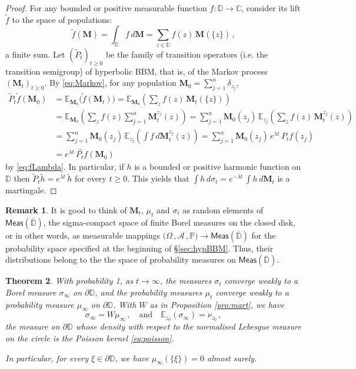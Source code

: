 \documentclass[12pt]{amsart}
\newcommand\A{\mathcal A}
\newcommand\AND{\quad\text{and}\quad}
\newcommand\C{\mathbb C}
\newcommand\E{\mathbb E}
\newcommand\DD{\mathbb D}
\newcommand\Laa{\sigma}
\newcommand\Mbf{\mathbf M}
\newcommand\Prob{\mathbb P}
\newcommand\wt{\widetilde}
\newcommand\ww{W}
\newtheorem{theorem}{Theorem}%
\numberwithin{theorem}{section}
\theoremstyle{definition}
\newtheorem{rem}[theorem]{Remark}%
\begin{document}
\begin{proof}
For any bounded or positive measurable function $f : \DD \to \C$, consider its lift 
$\wt f$ to the space of populations:
$$
\wt f(\Mbf) = \int_{\DD} f\, d\Mbf = \sum_{z \in \DD} f(z)\, \Mbf(\{z\})\,,
$$
a finite sum. Let $(\wt P_t)_{t\ge 0}$ be the family of transition operators (i.e. the 
transition semigroup) of hyperbolic BBM, that is, of the Markov process $(\Mbf_t)_{t\ge 0}$.
By \eqref{eq:Markov}, for any population $\Mbf_0 = \sum_{j=1}^n \delta_{z_j}$,
$$
\begin{aligned}
 \wt P_t \wt f(\Mbf_0) &= \E_{\Mbf_0}\bigl( \wt f (\Mbf_t) \bigr)
 = \E_{\Mbf_0}  \left( \sum_z f(z)\, \Mbf_t(\{z\}) \right)\\
 &= \E_{\Mbf_0}  \left( \sum_z f(z) \sum_{j=1}^n \Mbf^{z_j}_t(z) \right)
 = \sum_{j=1}^n \Mbf_0(z_j)\, \E_{z_j}\left( \sum_z f(z) \, \Mbf^{z_j}_t(z) \right)\\
 &= \sum_{j=1}^n \Mbf_0(z_j)\,\E_{z_j}\left( \int f \, d\Mbf^{z_j}_t(z) \right)
 = \sum_{j=1}^n \Mbf_0(z_j) \, e^{\lambda t} \, P_tf(z_j)\\
 &=  e^{\lambda t}\, \wt{P_t f}(\Mbf_0)
\end{aligned}
$$
by \eqref{eq:fLambda}. In particular, if $h$ is a bounded or positive harmonic function on $\DD$
then $\wt P_t \wt h = e^{\lambda t}\, \wt h$ for every $t \ge 0$. This yields that 
$\int h \, d\Laa_t = e^{-\lambda t} \, \int h \, d\Mbf_t$ is a martingale.
\end{proof}

\begin{rem}\label{rem:prob-on-meas} It is good to think of $\Mbf_t$, $\mu_t$ and 
$\sigma_t$ as  random elements of $\mathsf{Meas}(\overline{\DD})$, 
the sigma-compact space  of finite Borel measures on the closed disk, or in 
other words, as measurable mappings 
$\bigl(\Omega\,, \A\,,\Prob\bigr) \to \mathsf{Meas}(\overline{\DD})$ for the probability 
space specified at the beginning of \S \ref{sec:hypBBM}. Thus, their distributions belong to the 
the space of probability measures on $\mathsf{Meas}(\overline{\DD})$.
\end{rem}


\begin{theorem}\label{thm:weakconv}
With probability 1, as $t \to \infty$,  the measures $\Laa_t$ converge weakly
to a Borel measure $\Laa_{\infty}$ on $\partial \DD$, and 
the probability measures $\mu_t$ converge weakly to a probability measure 
$\mu_{\infty}$ on $\partial \DD$. With $\ww$ as in Proposition \ref{pro:mart},
we have 
$$
\Laa_{\infty} = \ww\mu_{\infty}\,, \AND \E_{z_0}(\Laa_{\infty}) = \nu_{z_0}\,,
$$
the measure on $\partial\DD$ whose density with respect to the normalised Lebesgue measure
on the circle is the Poisson kernel \eqref{eq:poisson}. 

In particular, for every $\xi \in \partial \DD$, we have 
$\mu_{\infty}(\{\xi\}) = 0$ almost surely. 
\end{theorem}
\end{document}
